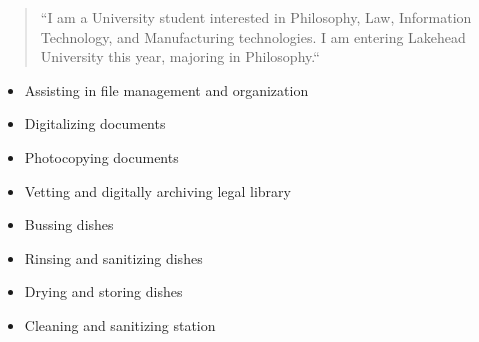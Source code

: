 \documentclass[10pt,a4paper,ragged2e,withhyper]{altacv}
\author{Jordan Hogan-Sharpe}
\date{\today}
\title{}
\begin{document}

\makecvheader

\begin{paracol}{2}

\label{sec:org8b65d56}
\begin{quote}
``I am a University student interested in Philosophy, Law, Information Technology, and Manufacturing technologies. I am entering Lakehead University this year, majoring in Philosophy.``
\end{quote}

\label{sec:org51e9bb0}

\begin{itemize}
\item Assisting in file management and organization
\item Digitalizing documents
\item Photocopying documents
\item Vetting and digitally archiving legal library
\end{itemize}

\label{sec:org28b6dff}

\begin{itemize}
\item Bussing dishes
\item Rinsing and sanitizing dishes
\item Drying and storing dishes
\item Cleaning and sanitizing station
\end{itemize}
\switchcolumn

\label{sec:org52035fb}

\divider

\newline
{}


\divider



\end{paracol}
\end{document}
